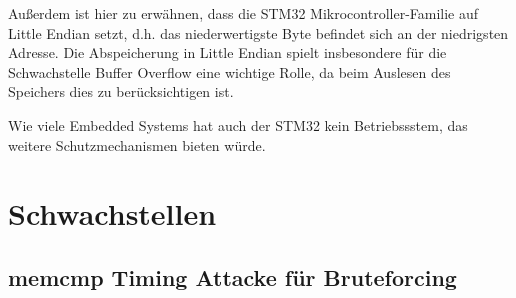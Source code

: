 \documentclass[a4paper,
DIV=13,
12pt,
BCOR=10mm,
department=FakIM,
oneside,
parskip=half,
automark,
listof=totocnumbered,
bibliography=totocnumbered,
acronym=totocnumbered
] {OTHRartcl}
\begin{document}
Außerdem ist hier zu erwähnen, dass die STM32 Mikrocontroller-Familie auf Little Endian setzt, d.h. das niederwertigste Byte befindet sich an der niedrigsten Adresse.
Die Abspeicherung in Little Endian spielt insbesondere für die Schwachstelle Buffer Overflow eine wichtige Rolle, da beim Auslesen des
Speichers dies zu berücksichtigen ist.

Wie viele Embedded Systems hat auch der STM32 kein Betriebssstem, das weitere Schutzmechanismen bieten würde.


\section{Schwachstellen}
\subsection{memcmp Timing Attacke für Bruteforcing}
\end{document}
